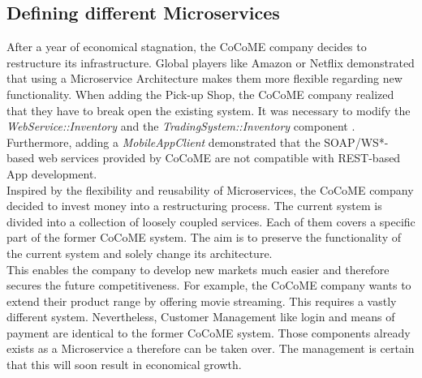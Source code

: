 \subsection{Defining different Microservices}
After a year of economical stagnation, the CoCoME company decides to restructure its infrastructure. Global players like Amazon or Netflix demonstrated that using a Microservice Architecture makes them more flexible regarding new functionality. When adding the Pick-up Shop, the CoCoME company realized that they have to break open the existing system. It was necessary to modify the \textit{WebService::Inventory} and the \textit{TradingSystem::Inventory} component \cite{HeinrichRostamiReussner2016_1000052688}. Furthermore, adding a \textit{MobileAppClient} demonstrated that the SOAP/WS*-based web services provided by CoCoME are not compatible with REST-based App development.
\\
Inspired by the flexibility and reusability of Microservices, the CoCoME company decided to invest money into a restructuring process. The current system is divided into a collection of loosely coupled services. Each of them covers a specific part of the former CoCoME system. The aim is to preserve the functionality of the current system and solely change its architecture.
\\
 This enables the company to develop new markets much easier and therefore secures the future competitiveness. For example, the CoCoME company wants to extend their product range by offering movie streaming. This requires a vastly different system. Nevertheless, Customer Management like login and means of payment are identical to the former CoCoME system. Those components already exists as a Microservice a therefore can be taken over. The management is certain that this will soon result in economical growth.








	
	
